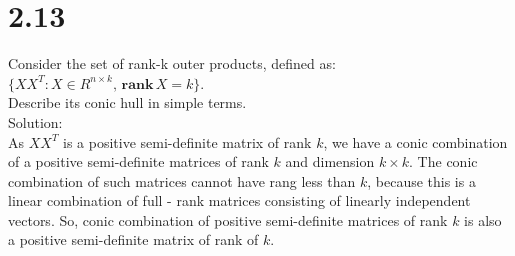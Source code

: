 \documentclass{article}
\begin{document}
\section*{2.13}
Consider the set of rank-k outer products, defined as:\\
$\{XX^T: X \in R^{n \times k}, \, \boldsymbol{rank} \, X = k\}$. 
\\ Describe its conic hull in simple terms.
\\ Solution:\\
As $XX^T$ is a positive semi-definite matrix of rank $k$, we have a conic combination of a positive semi-definite matrices 
of rank $k$ and dimension $k \times k$. The conic combination of such matrices cannot have rang less than $k$, because this is a linear combination of full - rank matrices consisting of linearly independent vectors. So, conic combination of positive semi-definite matrices of rank $k$ is also a positive semi-definite matrix of rank of $k$.
\end{document}
